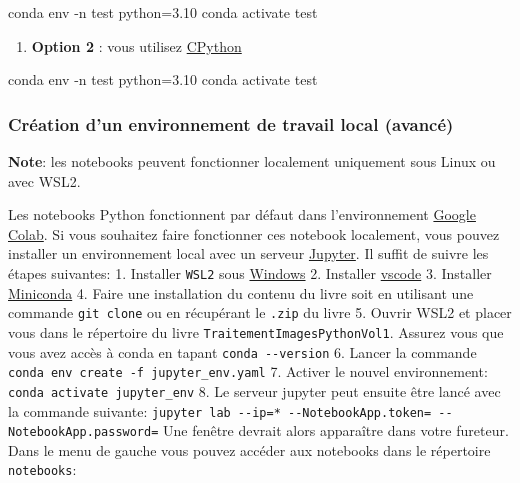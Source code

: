 \documentclass[11pt]{article}
\providecommand{\tightlist}{%
      \setlength{\itemsep}{0pt}\setlength{\parskip}{0pt}}
\newenvironment{Shaded}{}{}
\newcommand{\NormalTok}[1]{{#1}}
\newcommand{\ExtensionTok}[1]{{#1}}
\newcommand{\AttributeTok}[1]{\textcolor[rgb]{0.49,0.56,0.16}{{#1}}}
\begin{document}
\begin{Shaded}
\begin{Highlighting}[]
\ExtensionTok{conda}\NormalTok{ env }\AttributeTok{{-}n}\NormalTok{ test python=3.10}
\ExtensionTok{conda}\NormalTok{ activate test}
\end{Highlighting}
\end{Shaded}

\begin{enumerate}
\def\labelenumi{\arabic{enumi}.}
\setcounter{enumi}{1}
\tightlist
\item
  \textbf{Option 2} : vous utilisez
  \href{https://www.python.org/downloads/}{CPython}
\end{enumerate}

\begin{Shaded}
\begin{Highlighting}[]
\ExtensionTok{conda}\NormalTok{ env }\AttributeTok{{-}n}\NormalTok{ test python=3.10}
\ExtensionTok{conda}\NormalTok{ activate test}
\end{Highlighting}
\end{Shaded}

\hypertarget{cruxe9ation-dun-environnement-de-travail-local-avancuxe9}{%
\subsubsection{Création d'un environnement de travail local
(avancé)}\label{cruxe9ation-dun-environnement-de-travail-local-avancuxe9}}

\textbf{Note}: les notebooks peuvent fonctionner localement uniquement
sous Linux ou avec WSL2.

Les notebooks Python fonctionnent par défaut dans l'environnement
\href{https://colab.google/}{Google Colab}. Si vous souhaitez faire
fonctionner ces notebook localement, vous pouvez installer un
environnement local avec un serveur
\href{https://jupyterlab.readthedocs.io/en/stable/getting_started/starting.html}{Jupyter}.
Il suffit de suivre les étapes suivantes: 1. Installer \texttt{WSL2}
sous
\href{https://learn.microsoft.com/en-us/windows/wsl/install}{Windows} 2.
Installer
\href{https://code.visualstudio.com/docs/setup/windows}{vscode} 3.
Installer
\href{https://docs.anaconda.com/miniconda/install/\#quick-command-line-install}{Miniconda}
4. Faire une installation du contenu du livre soit en utilisant une
commande \texttt{git\ clone} ou en récupérant le \texttt{.zip} du livre
5. Ouvrir WSL2 et placer vous dans le répertoire du livre
\texttt{TraitementImagesPythonVol1}. Assurez vous que vous avez accès à
conda en tapant \texttt{conda\ -\/-version} 6. Lancer la commande
\texttt{conda\ env\ create\ -f\ jupyter\_env.yaml} 7. Activer le nouvel
environnement: \texttt{conda\ activate\ jupyter\_env} 8. Le serveur
jupyter peut ensuite être lancé avec la commande suivante:
\texttt{jupyter\ lab\ -\/-ip=\textquotesingle{}*\textquotesingle{}\ -\/-NotebookApp.token=\textquotesingle{}\textquotesingle{}\ -\/-NotebookApp.password=\textquotesingle{}\textquotesingle{}}
Une fenêtre devrait alors apparaître dans votre fureteur. Dans le menu
de gauche vous pouvez accéder aux notebooks dans le répertoire
\texttt{notebooks}:
\end{document}
